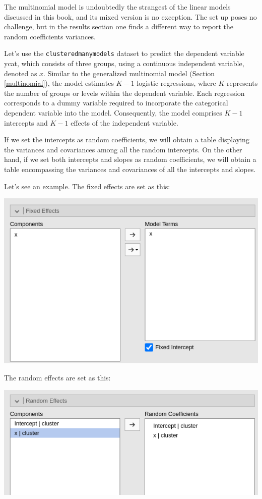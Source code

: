 \documentclass[
]{book}
\begin{document}
The multinomial model is undoubtedly the strangest of the linear models discussed in this book, and its mixed version is no exception. The set up poses no challenge, but in the results section one finds a different way to report the random coefficients variances.

Let's use the \texttt{clusteredmanymodels} dataset to predict the dependent variable ycat, which consists of three groups, using a continuous independent variable, denoted as \(x\). Similar to the generalized multinomial model (Section \ref{multinomial}), the model estimates \(K-1\) logistic regressions, where \(K\) represents the number of groups or levels within the dependent variable. Each regression corresponds to a dummy variable required to incorporate the categorical dependent variable into the model. Consequently, the model comprises \(K-1\) intercepts and \(K-1\) effects of the independent variable.

If we set the intercepts as random coefficients, we will obtain a table displaying the variances and covariances among all the random intercepts. On the other hand, if we set both intercepts and slopes as random coefficients, we will obtain a table encompassing the variances and covariances of all the intercepts and slopes.

Let's see an example. The fixed effects are set as this:

\includegraphics[width=0.7\linewidth]{bookletpics/5_multinomial_input1}

The random effects are set as this:

\includegraphics[width=0.7\linewidth]{bookletpics/5_multinomial_input2}
\end{document}
